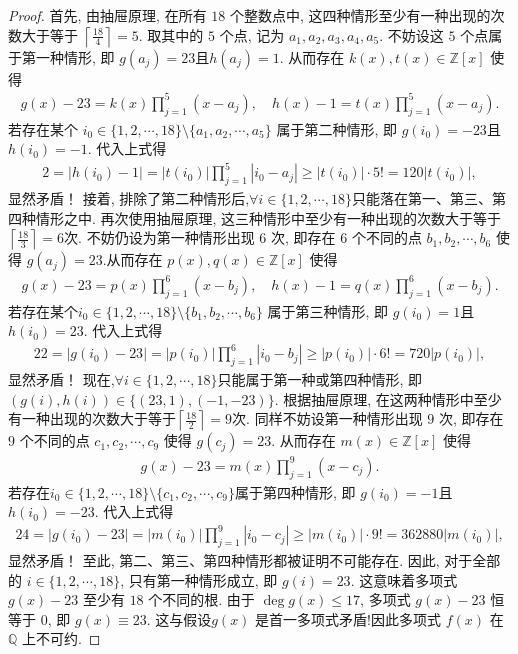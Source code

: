 \documentclass[../../main.tex]{subfiles}%
\begin{document}
\begin{proof}
首先, 由抽屉原理, 在所有 \(18\) 个整数点中, 这四种情形至少有一种出现的次数大于等于 \(\left\lceil \frac{18}{4} \right\rceil = 5\). 取其中的 \(5\) 个点, 记为 \(a_1, a_2, a_3, a_4, a_5\). 不妨设这 \(5\) 个点属于第一种情形, 即 \(g(a_j) = 23\)且\(h(a_j) = 1\). 从而存在 \(k(x), t(x) \in \mathbb{Z}[x]\) 使得
\begin{align*}
g(x)-23 = k(x) \prod\limits_{j=1}^{5}(x-a_j), \quad 
h(x)-1 = t(x) \prod\limits_{j=1}^{5}(x-a_j).
\end{align*}
若存在某个 \(i_0\in \{1,2,\cdots,18\}\setminus\{a_1,a_2,\cdots,a_5\}\) 属于第二种情形, 即 \(g(i_0) = -23\)且\(h(i_0) = -1\). 代入上式得
\begin{align*}
2=\left| h(i_0)-1 \right|=\left| t\left( i_0 \right) \right|\prod_{j=1}^5{\left| i_0-a_j \right|}\geqslant \left| t\left( i_0 \right) \right|\cdot 5!=120\left| t\left( i_0 \right) \right|,
\end{align*}
显然矛盾！
接着, 排除了第二种情形后,$\forall i\in \{1,2,\cdots,18\}$只能落在第一、第三、第四种情形之中. 再次使用抽屉原理, 这三种情形中至少有一种出现的次数大于等于\(\left\lceil \frac{18}{3} \right\rceil = 6\)次. 不妨仍设为第一种情形出现 \(6\) 次, 即存在 \(6\) 个不同的点 \(b_1, b_2, \cdots, b_6\) 使得 \(g(a_j) = 23\).从而存在 \(p(x), q(x) \in \mathbb{Z}[x]\) 使得
\begin{align*}
g(x)-23 = p(x) \prod\limits_{j=1}^{6}(x-b_j), \quad
h(x)-1 = q(x) \prod\limits_{j=1}^{6}(x-b_j).
\end{align*}
若存在某个\(i_0\in \{1,2,\cdots,18\}\setminus\{b_1,b_2,\cdots,b_6\}\) 属于第三种情形, 即 \(g(i_0) = 1\)且 \(h(i_0) = 23\). 代入上式得
\begin{align*}
22=\left| g\left( i_0 \right) -23 \right|=\left| p\left( i_0 \right) \right|\prod_{j=1}^6{\left| i_0-b_j \right|}\geqslant \left| p\left( i_0 \right) \right|\cdot 6!=720\left| p\left( i_0 \right) \right|,
\end{align*}
显然矛盾！
现在,$\forall i\in \{1,2,\cdots,18\}$只能属于第一种或第四种情形, 即 \((g(i), h(i)) \in \{(23, 1), (-1, -23)\}\). 根据抽屉原理, 在这两种情形中至少有一种出现的次数大于等于\(\left\lceil \frac{18}{2} \right\rceil = 9\)次.  同样不妨设第一种情形出现 \(9\) 次, 即存在 \(9\) 个不同的点 \(c_1, c_2, \cdots, c_9\) 使得 \(g(c_j) = 23\). 从而存在 \(m(x) \in \mathbb{Z}[x]\) 使得
\begin{align*}
g(x)-23 = m(x) \prod\limits_{j=1}^{9}(x-c_j).
\end{align*}
若存在\(i_0\in \{1,2,\cdots,18\}\setminus\{c_1,c_2,\cdots,c_9\}\)属于第四种情形, 即 \(g(i_0) = -1\)且\(h(i_0) = -23\). 代入上式得
\begin{align*}
24=\left| g\left( i_0 \right) -23 \right|=\left| m\left( i_0 \right) \right|\prod_{j=1}^9{\left| i_0-c_j \right|}\geqslant \left| m\left( i_0 \right) \right|\cdot 9!=362880\left| m\left( i_0 \right) \right|,
\end{align*}
显然矛盾！
至此, 第二、第三、第四种情形都被证明不可能存在. 因此, 对于全部的 \(i \in \{1,2,\cdots,18\}\), 只有第一种情形成立, 即 \(g(i) = 23\).
这意味着多项式 \(g(x) - 23\) 至少有 \(18\) 个不同的根. 由于 \(\deg g(x) \leqslant 17\), 多项式 \(g(x) - 23\) 恒等于 \(0\), 即 \(g(x) \equiv 23\).
这与假设\(g(x)\) 是首一多项式矛盾!因此多项式 \(f(x)\) 在 \(\mathbb{Q}\) 上不可约.
\end{proof}
\end{document}
